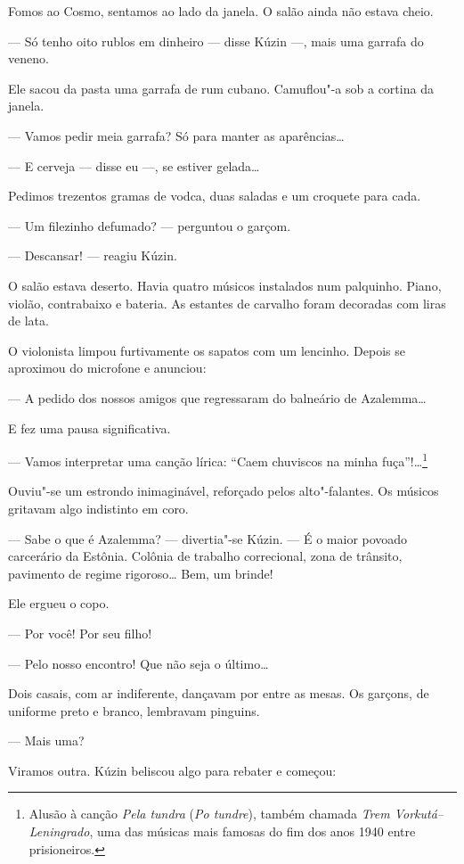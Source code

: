 Fomos ao Cosmo, sentamos ao lado da janela. O salão ainda não estava
cheio. 

--- Só tenho oito rublos em dinheiro --- disse Kúzin ---, mais uma
garrafa do veneno.

Ele sacou da pasta uma garrafa de rum cubano. Camuflou"-a sob a cortina
da janela.

--- Vamos pedir meia garrafa? Só para manter as aparências\ldots{}

--- E cerveja --- disse eu ---, se estiver gelada\ldots{}

Pedimos trezentos gramas de vodca, duas saladas e um croquete para cada.

--- Um filezinho defumado? --- perguntou o garçom.

--- Descansar! --- reagiu Kúzin.

O salão estava deserto. Havia quatro músicos instalados num palquinho.
Piano, violão, contrabaixo e bateria. As estantes de carvalho foram
decoradas com liras de lata.

O violonista limpou furtivamente os sapatos com um lencinho. Depois se
aproximou do microfone e anunciou:

--- A pedido dos nossos amigos que regressaram do balneário de
Azalemma\ldots{}

E fez uma pausa significativa.

--- Vamos interpretar uma canção lírica: ``Caem chuviscos na minha
fuça''!\ldots{}\footnote{Alusão à canção \emph{Pela tundra} (\emph{Po
  tundre}), também chamada \emph{Trem Vorkutá--Leningrado}, uma
  das músicas mais famosas do fim dos anos 1940 entre prisioneiros.}

Ouviu"-se um estrondo inimaginável, reforçado pelos alto"-falantes. Os
músicos gritavam algo indistinto em coro.

--- Sabe o que é Azalemma? --- divertia"-se Kúzin. --- É o maior povoado
carcerário da Estônia. Colônia de trabalho correcional, zona de
trânsito, pavimento de regime rigoroso\ldots{} Bem, um brinde!

Ele ergueu o copo.

--- Por você! Por seu filho!

--- Pelo nosso encontro! Que não seja o último\ldots{}

Dois casais, com ar indiferente, dançavam por entre as mesas. Os
garçons, de uniforme preto e branco, lembravam pinguins.

--- Mais uma?

Viramos outra. Kúzin beliscou algo para rebater e começou:

